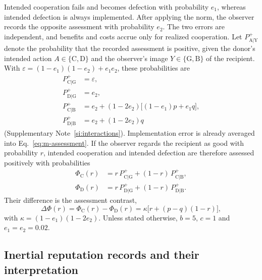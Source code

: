 \documentclass[10pt]{wlscirep}
\newcommand{\st}[1]{\mathrm{#1}}           %
\newcommand{\Pp}[1]{P^{+}_{\mathrm{#1}}}   %
\newcommand{\PhiC}{\Phi_{\mathrm{C}}}
\newcommand{\PhiD}{\Phi_{\mathrm{D}}}
\theoremstyle{plain}
\theoremstyle{remark}
\begin{document}
Intended cooperation fails and becomes defection with probability $e_1$, whereas intended defection is always implemented. After applying the norm, the observer records the opposite assessment with probability $e_2$. The two errors are independent, and benefits and costs accrue only for realized cooperation. Let $\Pp{A|Y}$ denote the probability that the recorded assessment is positive, given the donor's intended action $A\in\{\st C,\st D\}$ and the observer's image $Y\in\{\st G,\st B\}$ of the recipient. With $\varepsilon=(1-e_1)(1-e_2)+e_1e_2$, these probabilities are
\begin{equation}
\begin{aligned}
\Pp{C|G}&=\varepsilon,\\
\Pp{D|G}&=e_2,\\
\Pp{C|B}&=e_2+(1-2e_2)\bigl[(1-e_1)p+e_1q\bigr],\\
\Pp{D|B}&=e_2+(1-2e_2)q
\end{aligned}
\label{eq:m-assessment}
\end{equation}
(Supplementary Note~\ref{si:interactions}). Implementation error is already averaged into Eq.~\eqref{eq:m-assessment}. If the observer regards the recipient as good with probability $r$, intended cooperation and intended defection are therefore assessed positively with probabilities
\begin{equation}
\begin{aligned}
\PhiC(r)&=r\,\Pp{C|G}+(1-r)\,\Pp{C|B},\\
\PhiD(r)&=r\,\Pp{D|G}+(1-r)\,\Pp{D|B}.
\end{aligned}
\label{eq:m-phi}
\end{equation}
Their difference is the assessment contrast,
\begin{equation}
\Delta\Phi(r)=\PhiC(r)-\PhiD(r)=\kappa\bigl[r+(p-q)(1-r)\bigr],
\label{eq:m-contrast}
\end{equation}
with $\kappa=(1-e_1)(1-2e_2)$. Unless stated otherwise, $b=5$, $c=1$ and $e_1=e_2=0.02$.

\subsection*{Inertial reputation records and their interpretation}
\end{document}
